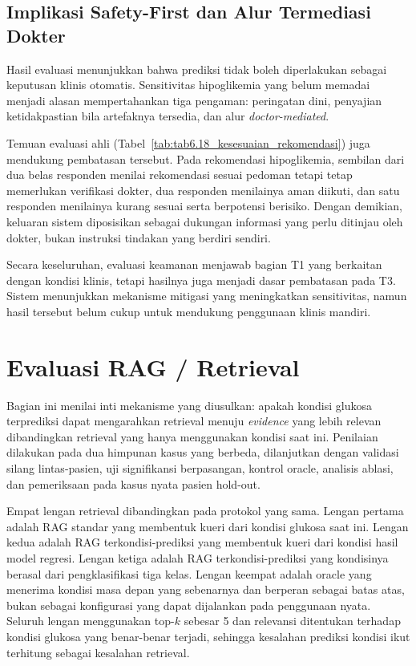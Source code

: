 \subsection{Implikasi Safety-First dan Alur Termediasi Dokter}
\label{subsec:bab6-implikasi-safety-first-design}

Hasil evaluasi menunjukkan bahwa prediksi tidak boleh diperlakukan sebagai keputusan klinis otomatis. Sensitivitas hipoglikemia yang belum memadai
menjadi alasan mempertahankan tiga pengaman: peringatan dini, penyajian ketidakpastian bila artefaknya tersedia, dan alur \textit{doctor-mediated}.

Temuan evaluasi ahli (Tabel~\ref{tab:tab6.18_kesesuaian_rekomendasi}) juga mendukung pembatasan tersebut. Pada rekomendasi hipoglikemia, sembilan dari
dua belas responden menilai rekomendasi sesuai pedoman tetapi tetap memerlukan verifikasi dokter, dua responden menilainya aman diikuti, dan satu responden
menilainya kurang sesuai serta berpotensi berisiko. Dengan demikian, keluaran sistem diposisikan sebagai dukungan informasi yang perlu ditinjau oleh dokter,
bukan instruksi tindakan yang berdiri sendiri.

Secara keseluruhan, evaluasi keamanan menjawab bagian T1 yang berkaitan dengan kondisi klinis, tetapi hasilnya juga menjadi dasar pembatasan pada T3.
Sistem menunjukkan mekanisme mitigasi yang meningkatkan sensitivitas, namun hasil tersebut belum cukup untuk mendukung penggunaan klinis mandiri.


\section{Evaluasi RAG / Retrieval}
\label{sec:bab6-evaluasi-rag-retrieval}

Bagian ini menilai inti mekanisme yang diusulkan: apakah kondisi glukosa terprediksi dapat mengarahkan retrieval menuju \textit{evidence} yang lebih relevan
dibandingkan retrieval yang hanya menggunakan kondisi saat ini. Penilaian dilakukan pada dua himpunan kasus yang berbeda, dilanjutkan dengan validasi silang
lintas-pasien, uji signifikansi berpasangan, kontrol oracle, analisis ablasi, dan pemeriksaan pada kasus nyata pasien hold-out.

Empat lengan retrieval dibandingkan pada protokol yang sama. Lengan pertama adalah RAG standar yang membentuk kueri dari kondisi glukosa saat ini. Lengan kedua
adalah RAG terkondisi-prediksi yang membentuk kueri dari kondisi hasil model regresi. Lengan ketiga adalah RAG terkondisi-prediksi yang kondisinya berasal dari
pengklasifikasi tiga kelas. Lengan keempat adalah oracle yang menerima kondisi masa depan yang sebenarnya dan berperan sebagai batas atas, bukan sebagai
konfigurasi yang dapat dijalankan pada penggunaan nyata. Seluruh lengan menggunakan top-\(k\) sebesar 5 dan relevansi ditentukan terhadap kondisi glukosa yang
benar-benar terjadi, sehingga kesalahan prediksi kondisi ikut terhitung sebagai kesalahan retrieval.

